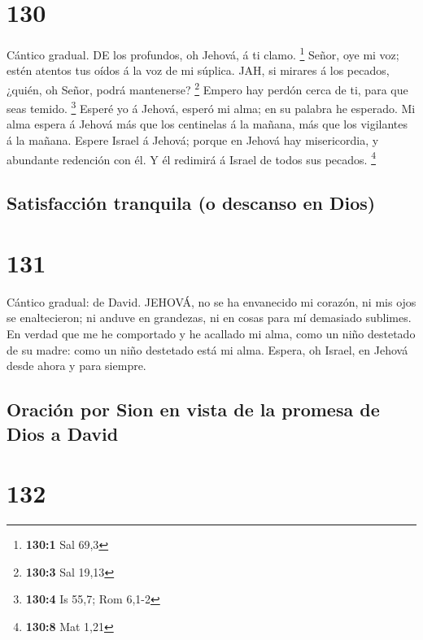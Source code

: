 \hypertarget{section-129}{%
\section{130}\label{section-129}}

 Cántico gradual. DE los profundos, oh Jehová, á ti clamo.
\footnote{\textbf{130:1} Sal 69,3}  Señor, oye mi voz; estén
atentos tus oídos á la voz de mi súplica.  JAH, si mirares á
los pecados, ¿quién, oh Señor, podrá mantenerse? \footnote{\textbf{130:3}
  Sal 19,13}  Empero hay perdón cerca de ti, para que seas
temido. \footnote{\textbf{130:4} Is 55,7; Rom 6,1-2}  Esperé
yo á Jehová, esperó mi alma; en su palabra he esperado.  Mi
alma espera á Jehová más que los centinelas á la mañana, más que los
vigilantes á la mañana.  Espere Israel á Jehová; porque en
Jehová hay misericordia, y abundante redención con él.  Y él
redimirá á Israel de todos sus pecados. \footnote{\textbf{130:8} Mat
  1,21}

\hypertarget{satisfacciuxf3n-tranquila-o-descanso-en-dios}{%
\subsection{Satisfacción tranquila (o descanso en
Dios)}\label{satisfacciuxf3n-tranquila-o-descanso-en-dios}}

\hypertarget{section-130}{%
\section{131}\label{section-130}}

 Cántico gradual: de David. JEHOVÁ, no se ha envanecido mi
corazón, ni mis ojos se enaltecieron; ni anduve en grandezas, ni en
cosas para mí demasiado sublimes.  En verdad que me he
comportado y he acallado mi alma, como un niño destetado de su madre:
como un niño destetado está mi alma.  Espera, oh Israel, en
Jehová desde ahora y para siempre.

\hypertarget{oraciuxf3n-por-sion-en-vista-de-la-promesa-de-dios-a-david}{%
\subsection{Oración por Sion en vista de la promesa de Dios a
David}\label{oraciuxf3n-por-sion-en-vista-de-la-promesa-de-dios-a-david}}

\hypertarget{section-131}{%
\section{132}\label{section-131}}

